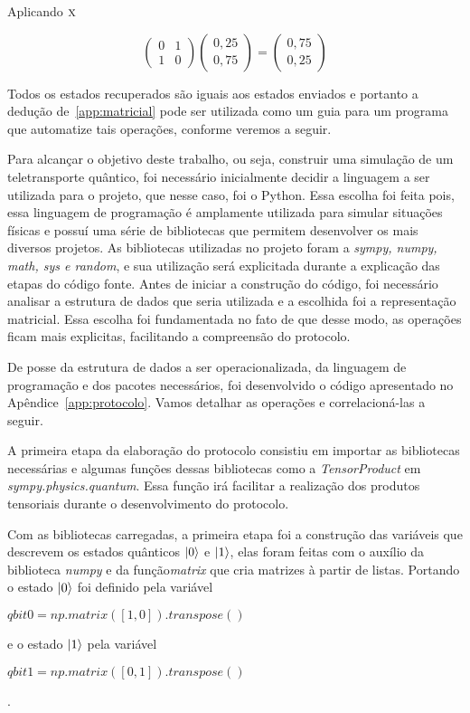 Aplicando \(\operatorname{\textsc{x}}\)

\begin{equation}
\begin{pmatrix}
0 & 1 \\
1 & 0
\end{pmatrix} \begin{pmatrix}
0,25 \\
0,75
\end{pmatrix} = \begin{pmatrix}
0,75 \\
0,25
\end{pmatrix}
\end{equation}

Todos os estados recuperados são iguais aos estados enviados e portanto a dedução de~\ref{app:matricial} pode ser utilizada como um guia para um programa que automatize tais operações, conforme veremos a seguir.

Para alcançar o objetivo deste trabalho, ou seja, construir uma simulação de um teletransporte quântico, foi necessário inicialmente decidir a linguagem a ser utilizada para o projeto, que nesse caso, foi o Python. Essa escolha foi feita pois, essa linguagem de programação é amplamente utilizada para simular situações físicas e possuí uma série de bibliotecas que permitem desenvolver os mais diversos projetos. As bibliotecas utilizadas no projeto foram a \textit{sympy, numpy, math, sys e random}, e sua utilização será explicitada durante a explicação das etapas do código fonte. Antes de iniciar a construção do código, foi necessário analisar a estrutura de dados que seria utilizada e a escolhida foi a representação matricial. Essa escolha foi fundamentada no fato de que desse modo, as operações ficam mais explicitas, facilitando a compreensão do protocolo.

De posse da estrutura de dados a ser operacionalizada, da linguagem de programação e dos pacotes necessários, foi desenvolvido o código apresentado no Apêndice~\ref{app:protocolo}. Vamos detalhar as operações e correlacioná-las a seguir.

A primeira etapa da elaboração do protocolo consistiu em importar as bibliotecas necessárias e algumas funções dessas bibliotecas como a \textit{TensorProduct} em \textit{sympy.physics.quantum}. Essa função irá facilitar a realização dos produtos tensoriais durante o desenvolvimento do protocolo.

Com as bibliotecas carregadas, a primeira etapa foi a construção das variáveis que descrevem os estados quânticos $\ket{0}$ e $\ket{1}$, elas foram feitas com o auxílio da biblioteca \textit{numpy} e da função\textit{matrix} que cria matrizes à partir de listas. Portando o estado $\ket{0}$ foi definido pela variável \begin{tiny}\textbf{$qbit0= np.matrix([1,0]).transpose()$}\end{tiny} e o estado $\ket{1}$ pela variável \begin{tiny}\textbf{$qbit1= np.matrix([0,1]).transpose()$}\end{tiny}.

